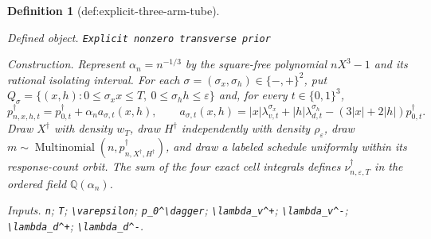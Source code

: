 \documentclass{article}
\newtheorem{definition}{Definition}
\begin{document}
\begin{definition}[def:explicit-three-arm-tube]\label{def:explicit-three-arm-tube}
\par\smallskip\noindent\emph{Defined object.} \texttt{Explicit nonzero transverse prior}
\par\smallskip\noindent\emph{Construction.} Represent \(\alpha_n=n^{-1/3}\) by the square-free polynomial \(nX^3-1\) and its rational isolating interval. For each \(\sigma=(\sigma_x,\sigma_h)\in\{-,+\}^2\), put \(Q_\sigma=\{(x,h):0\le\sigma_xx\le T,\ 0\le\sigma_hh\le\varepsilon\}\) and, for every \(t\in\{0,1\}^3\), \[p_{n,x,h,t}^\dagger=p_{0,t}^\dagger+\alpha_na_{\sigma,t}(x,h),\qquad a_{\sigma,t}(x,h)=|x|\lambda_{v,t}^{\sigma_x}+|h|\lambda_{d,t}^{\sigma_h}-(3|x|+2|h|)p_{0,t}^\dagger.\] Draw \(X^\dagger\) with density \(w_T\), draw \(H^\dagger\) independently with density \(\rho_\varepsilon\), draw \(m\sim\operatorname{Multinomial}(n,p_{n,X^\dagger,H^\dagger}^\dagger)\), and draw a labeled schedule uniformly within its response-count orbit. The sum of the four exact cell integrals defines \(\nu_{n,\varepsilon,T}^\dagger\) in the ordered field \(\mathbb Q(\alpha_n)\).
\par\smallskip\noindent\emph{Inputs.} \texttt{n}; \texttt{T}; \texttt{\textbackslash{}\allowbreak{}varepsilon}; \texttt{p\_\allowbreak{}0\textasciicircum{}\textbackslash{}\allowbreak{}dagger}; \texttt{\textbackslash{}\allowbreak{}lambda\_\allowbreak{}v\textasciicircum{}+\allowbreak{}}; \texttt{\textbackslash{}\allowbreak{}lambda\_\allowbreak{}v\textasciicircum{}-\allowbreak{}}; \texttt{\textbackslash{}\allowbreak{}lambda\_\allowbreak{}d\textasciicircum{}+\allowbreak{}}; \texttt{\textbackslash{}\allowbreak{}lambda\_\allowbreak{}d\textasciicircum{}-\allowbreak{}}.
\end{definition}
\end{document}
